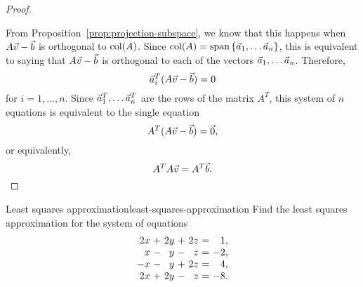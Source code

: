 \documentclass{ximera}
\begin{document}
\begin{proof}
\begin{center}
  \end{center}
  From Proposition~\ref{prop:projection-subspace}, we know that this
  happens when $A\vec{v}-\vec{b}$ is orthogonal to $\text{col}(A)$. Since
  $\text{col}(A)=\text{span}\left\{\vec{a}_1,\ldots\vec{a}_n\right\}$, this is
  equivalent to saying that $A\vec{v}-\vec{b}$ is orthogonal to each of
  the vectors $\vec{a}_1,\ldots\vec{a}_n$. Therefore,
  \begin{equation*}
    \vec{a}_i^T(A\vec{v}-\vec{b})=0
  \end{equation*}
  for $i=1,\ldots,n$. Since $\vec{a}_1^T,\ldots\vec{a}_n^T$ are the
  rows of the matrix $A^T$, this system of $n$ equations is equivalent
  to the single equation
  \begin{equation*}
    A^T(A\vec{v}-\vec{b})=\vec{0},
  \end{equation*}
  or equivalently,
  \begin{equation*}
    A^TA\vec{v} = A^T\vec{b}.
  \end{equation*}
\end{proof}

\begin{example}{Least squares approximation}{least-squares-approximation}
  Find the least squares approximation for the system of equations
  \begin{equation*}
    \begin{array}{r@{~}c@{~}r@{~}c@{~}r@{~}c@{~}r}
      2x &+& 2y &+& 2z &=&  1, \\
      x  &-&  y &-&  z &=& -2, \\
      -x &-&  y &+& 2z &=&  4, \\
      2x &+& 2y &-&  z &=& -8. \\
    \end{array}
  \end{equation*}
\end{example}
\end{document}
